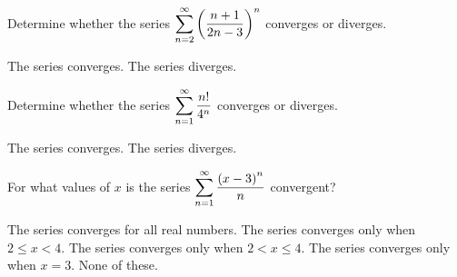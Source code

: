 \documentclass[12pt]{exam}
\newcommand{\ds}{\ensuremath{\displaystyle}}
\begin{document}
\begin{center}
\end{center}
\vspace{0.1in}

\begin{questions}

\setcounter{question}{0}
\question[10]
Determine whether the series
$\ds \sum_{n = 2}^{\infty} \left(\frac{n+1}{2n-3}\right)^n$
converges or diverges.

\begin{checkboxes}
\CorrectChoice The series converges.
\choice The series diverges.
\end{checkboxes}

\vfill

\question[10]
Determine whether the series $\ds \sum_{n = 1}^{\infty} \frac{n!}{4^n}$
converges or diverges.

\begin{checkboxes}
\choice The series converges.
\CorrectChoice The series diverges.
\end{checkboxes}

\vfill

\question[5]
For what values of $x$ is the series
$\ds \sum_{n=1}^{\infty} \frac{\left(x-3\right)^n}{n}$ convergent?

\begin{checkboxes}
\choice The series converges for all real numbers.
\choice The series converges only when $2\leq x<4$.
\choice The series converges only when $2<x\leq 4$.
\choice The series converges only when $x=3$.
\choice None of these.
\end{checkboxes}

\vfill

\end{questions}
\end{document}
